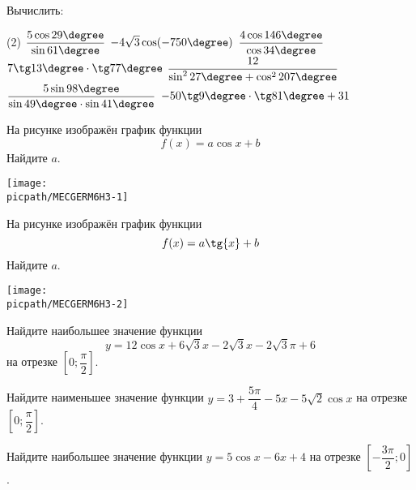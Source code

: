 \begin{class}[number=1]
\begin{listofex}
		\item Вычислить: 
		\begin{tasks}(2)
			\task \( \dfrac{5\cos29\degree}{\sin61\degree} \)
			\task \( -4\sqrt{3}\cos(-750\degree) \)
			\task \( \dfrac{4\cos146\degree}{\cos34\degree} \)
			\task \( 7\tg13\degree\cdot\tg77\degree \)
			\task \( \dfrac{12}{\sin^227\degree+\cos^2207\degree} \)
			\task \( \dfrac{5\sin98\degree}{\sin49\degree\cdot\sin41\degree} \)
			\task \( -50\tg9\degree\cdot\tg81\degree+31 \)
		\end{tasks}
		\item
		\begin{minipage}[t]{\bodywidth}
			На рисунке изображён график функции \[ f(x)=a \cos{x}+b \] Найдите \(a\).
		\end{minipage}
		\hspace{0.02\linewidth}
		\begin{minipage}[t]{\picwidth}
			\texttt{[image: \\picpath/MECGERM6H3-1]}
		\end{minipage}
		\item
		\begin{minipage}[t]{\bodywidth}
			На рисунке изображён график функции \[ f(x)=a \tg{x}+b \] Найдите \(a\).
		\end{minipage}
		\hspace{0.02\linewidth}
		\begin{minipage}[t]{\picwidth}
			\texttt{[image: \\picpath/MECGERM6H3-2]}
		\end{minipage}
		\item Найдите наибольшее значение функции \[ y=12\cos x + 6\sqrt{3}x - 2 \sqrt{3}x - 2 \sqrt{3} \pi + 6\] на отрезке \( \left[ 0; \dfrac{ \pi }{ 2 } \right]  \).
		\item Найдите наименьшее значение функции \( y=3+\dfrac{ 5\pi }{ 4 }-5x-5\sqrt{2} \cos x\) на отрезке \( \left[ 0; \dfrac{ \pi }{ 2 } \right]  \).
		\item Найдите наибольшее значение функции \( y=5 \cos x - 6x + 4 \) на отрезке \( \left[ -\dfrac{ 3\pi }{ 2 }; 0 \right]  \).
	\end{listofex}
\end{class}

